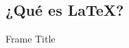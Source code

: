 \documentclass[../slides.tex]{subfiles}
\begin{document}
    \tableofcontents

    \subsection{¿Qué es \LaTeX{}?}
        
    
    \begin{frame}{Frame Title}

        
    \end{frame}

    \subsection{}
\end{document}
